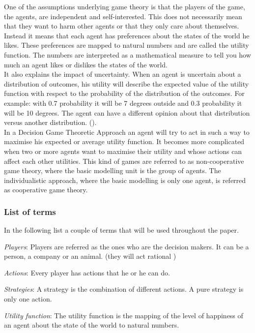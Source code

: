 One of the assumptions underlying game theory is that the players of the game, the agents, are independent and self-interested. This does not necessarily mean that they want to harm other agents or that they only care about themselves. 
Instead it means that each agent has preferences about the states of the world he likes. These preferences are mapped to natural numbers and are called the utility function. The numbers are interpreted as a mathematical measure to tell you how much an agent likes or dislikes the states of the world. \\
It also explains the impact of uncertainty. When an agent is uncertain about a distribution of outcomes, his utility will describe the expected value of the utility function with respect to the probability of the distribution of the outcomes. For example: with 0.7 probability it will be 7 degrees outside and 0.3 probability it will be 10 degrees. The agent can have a different opinion about that distribution versus another distribution. ().\\
In a Decision Game Theoretic Approach an agent will try to act in such a way to maximise his expected or average utility function. It becomes more complicated when two or more agents want to maximise their utility and whose actions can affect each other utilities. This kind of games are referred to as non-cooperative game theory, where the basic modelling unit is the group of agents. The individualistic approach, where the basic modelling is only one agent, is referred as cooperative game theory. 

\subsubsection{List of terms}
In the following list a couple of terms that will be used throughout the paper.
\begin{description}
\item \textit{Players}: Players are referred as the ones who are the decision makers. It can be a person, a company or an animal.  (they will act rational )
\item \textit{Actions}: Every player has actions that he or he can do. 
\item \textit{Strategies}: A strategy is the combination of different actions. A pure strategy is only one action.
\item \textit{Utility function}: The utility function is the mapping of the level of happiness of an agent about the state of the world to natural numbers.

\end{description}

